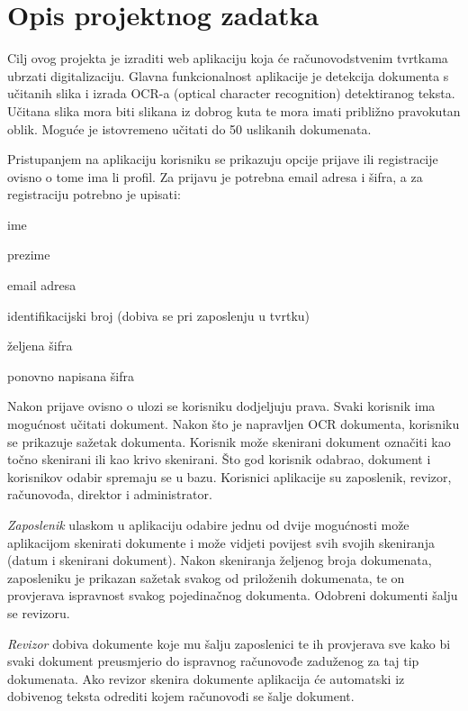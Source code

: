 \chapter{Opis projektnog zadatka}
		
		Cilj ovog projekta je izraditi web aplikaciju koja će 
		računovodstvenim tvrtkama ubrzati digitalizaciju. Glavna funkcionalnost aplikacije je detekcija dokumenta
		s učitanih slika i izrada OCR-a (optical character recognition) detektiranog teksta. Učitana slika mora biti slikana iz dobrog kuta te mora imati približno pravokutan oblik. Moguće je istovremeno učitati do 50 uslikanih dokumenata.
		
		Pristupanjem na aplikaciju korisniku se prikazuju opcije prijave ili registracije ovisno o tome ima li profil. Za prijavu je potrebna email adresa i šifra, a za registraciju  potrebno je upisati:
		\begin{packed_item}
			\item {ime}
			\item {prezime}
			\item {email adresa}
			\item {identifikacijski broj (dobiva se pri zaposlenju u tvrtku)}
			\item {željena šifra}
			\item {ponovno napisana šifra}
		\end{packed_item}
		
		Nakon prijave ovisno o ulozi se korisniku dodjeljuju prava. Svaki korisnik ima mogućnost učitati dokument. Nakon što je napravljen OCR dokumenta, korisniku se prikazuje sažetak dokumenta. Korisnik može skenirani dokument označiti kao točno skenirani ili kao krivo skenirani. Što god korisnik odabrao, dokument i korisnikov odabir spremaju se u bazu.	Korisnici aplikacije su zaposlenik, revizor, računovođa, direktor i administrator.
		
		\textit {Zaposlenik} ulaskom u aplikaciju odabire jednu od dvije mogućnosti može aplikacijom skenirati dokumente i može vidjeti povijest svih svojih skeniranja (datum i skenirani dokument). Nakon skeniranja željenog broja dokumenata, zaposleniku je prikazan sažetak svakog od priloženih dokumenata, te on provjerava ispravnost svakog pojedinačnog dokumenta. Odobreni dokumenti šalju se revizoru. 
		
		\textit{Revizor} dobiva dokumente koje mu šalju zaposlenici te ih provjerava sve kako bi svaki dokument preusmjerio do ispravnog računovođe zaduženog za taj tip dokumenata. Ako revizor skenira dokumente aplikacija će automatski iz dobivenog teksta odrediti kojem računovođi se šalje dokument.
		
